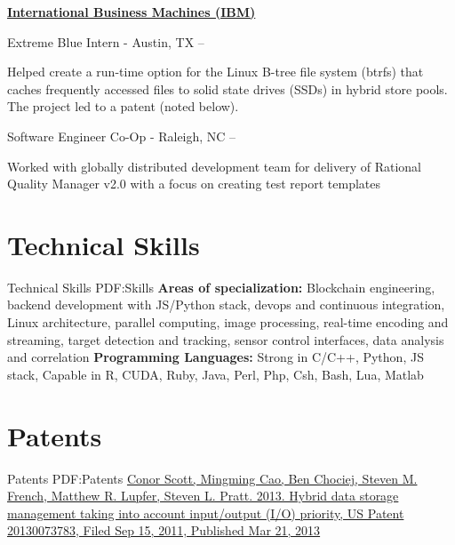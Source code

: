 \documentclass[a4paper,10pt,oneside]{article}
\begin{document}
\begin{minipage}[t][0pt]{\linewidth}
\begin{body}
\EntryGap

\href{www.ibm.com}
{\textbf{International Business Machines (IBM)}}
\par
Extreme Blue Intern - Austin, TX
\hfill
{} --
\begin{detail}
\BulletItem
Helped create a run-time option for the Linux B-tree file system (btrfs) that caches frequently accessed files to solid state drives (SSDs) in hybrid store pools. The project led to a patent (noted below). 
\end{detail}

\par
Software Engineer Co-Op - Raleigh, NC
\hfill
{} --
\begin{detail}
\BulletItem
Worked with globally distributed development team for delivery of Rational Quality Manager v2.0 with a focus on creating test report templates
\end{detail}


\section
{Technical Skills}
{Technical Skills}
{PDF:Skills}
\textbf{Areas of specialization:} Blockchain engineering, backend development with JS/Python stack, devops and continuous integration, Linux architecture, parallel computing, image processing, real-time encoding and streaming, target detection and tracking, sensor control interfaces, data analysis and correlation
\newline
\textbf{Programming Languages:} Strong in C/C++, Python, JS stack, Capable in R, CUDA, Ruby, Java, Perl, Php, Csh, Bash, Lua, Matlab


\section
{Patents}
{Patents}
{PDF:Patents}
\href{https://www.google.com/patents/US20130073783}
{Conor Scott, Mingming Cao, Ben Chociej, Steven M. French, Matthew R. Lupfer, Steven L. Pratt. 2013. Hybrid data storage management taking into account input/output (I/O) priority, US Patent 20130073783, Filed Sep 15, 2011, Published Mar 21, 2013 }
\end{body}
\end{minipage}
\label{LastPage}
\end{document}
